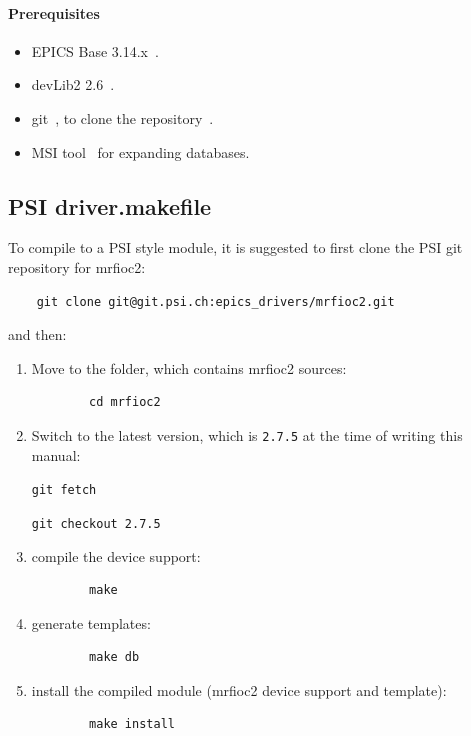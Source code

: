 \documentclass[12pt,a4paper]{article}
\newcommand{\latestDriverVersion}{2.7.5}
\begin{document}
\paragraph{Prerequisites}
\begin{itemize}
\item 
	EPICS Base 3.14.x~\cite{epics}.
\item 
	devLib2 2.6~\cite{devlib2}.
\item
	git~\cite{git}, to clone the repository~\cite{git_mrfioc2}.
\item 
	MSI tool~\cite{msi} for expanding databases.
\end{itemize}

\subsection{PSI driver.makefile}\label{sec:PSI driver.makefile}
To compile to a PSI style module, it is suggested to first clone the PSI git repository for mrfioc2:
\begin{verbatim}
	git clone git@git.psi.ch:epics_drivers/mrfioc2.git
\end{verbatim}
and then:
\begin{enumerate}
\item
	Move to the folder, which contains mrfioc2 sources:
	\begin{verbatim}
		cd mrfioc2
	\end{verbatim}
	
\item 
	Switch to the latest version, which is \texttt{\latestDriverVersion} at the time of writing this manual:
	
	\texttt{git fetch}
	
	\texttt{git checkout \latestDriverVersion}
	
\item
	compile the device support:
	\begin{verbatim}
		make
	\end{verbatim}

\item 
	generate templates:
	\begin{verbatim}
		make db
	\end{verbatim}

\item 
	install the compiled module (mrfioc2 device support and template):
	\begin{verbatim}
		make install
	\end{verbatim}
\end{enumerate}
\end{document}
